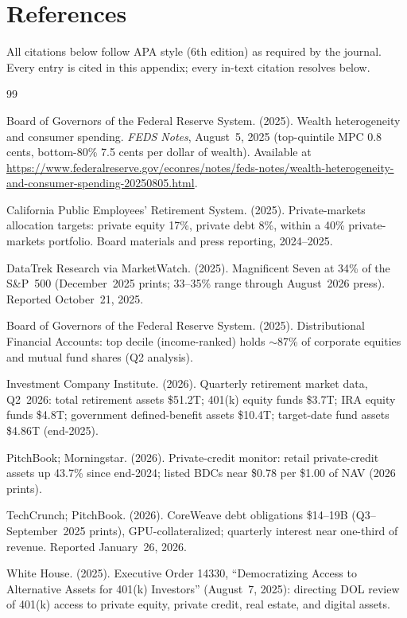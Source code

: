 \documentclass[11pt,a4paper]{article}
\begin{document}
\renewcommand{\refname}{}
\section*{References}
All citations below follow APA style (6th edition) as required by the journal. Every entry is cited in this appendix; every in-text citation resolves below.

\begin{thebibliography}{99}

Board of Governors of the Federal Reserve System. (2025).
Wealth heterogeneity and consumer spending.
\emph{FEDS Notes}, August~5, 2025 (top-quintile MPC 0.8 cents, bottom-80\%
7.5 cents per dollar of wealth).
Available at \url{https://www.federalreserve.gov/econres/notes/feds-notes/wealth-heterogeneity-and-consumer-spending-20250805.html}.

California Public Employees' Retirement System. (2025).
Private-markets allocation targets: private equity 17\%, private debt 8\%,
within a 40\% private-markets portfolio.
Board materials and press reporting, 2024--2025.

DataTrek Research via MarketWatch. (2025).
Magnificent Seven at 34\% of the S\&P~500 (December~2025 prints; 33--35\%
range through August~2026 press).
Reported October~21, 2025.

Board of Governors of the Federal Reserve System. (2025).
Distributional Financial Accounts: top decile (income-ranked) holds
$\sim$87\% of corporate equities and mutual fund shares (Q2 analysis).

Investment Company Institute. (2026).
Quarterly retirement market data, Q2~2026: total retirement assets
\$51.2T; 401(k) equity funds \$3.7T; IRA equity funds \$4.8T; government
defined-benefit assets \$10.4T; target-date fund assets \$4.86T (end-2025).

PitchBook; Morningstar. (2026).
Private-credit monitor: retail private-credit assets up 43.7\% since
end-2024; listed BDCs near \$0.78 per \$1.00 of NAV (2026 prints).

TechCrunch; PitchBook. (2026).
CoreWeave debt obligations \$14--19B (Q3--September~2025 prints),
GPU-collateralized; quarterly interest near one-third of revenue.
Reported January~26, 2026.

White House. (2025).
Executive Order 14330, ``Democratizing Access to Alternative Assets for
401(k) Investors'' (August~7, 2025): directing DOL review of 401(k)
access to private equity, private credit, real estate, and digital assets.
\end{thebibliography}
\end{document}
